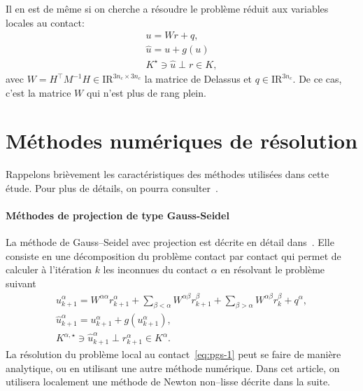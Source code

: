 \documentclass{CSMA2017}
\def\RR{\nbR}
\def\nbR{\ensuremath{\mathrm{I\!R}}} %
\begin{document}
Il en est de même si on cherche a résoudre le problème réduit aux variables locales au contact:
\begin{equation}\label{eq:soccp1-intro}
  \begin{array}{l}
    u = W r + q,  \\
    \hat u = u + g(u) \\
        K^\star \ni {\hat u} \perp r \in K,
  \end{array}
\end{equation}
avec $W = H^\top M^{-1} H \in \RR^{3n_c\times 3n_c}$ la matrice de Delassus et $q\in \RR^{3n_c}$. De ce cas, c'est la matrice $W$ qui n'est plus de rang plein.


\section{Méthodes numériques de résolution}
Rappelons brièvement les caractéristiques des méthodes utilisées dans cette étude. Pour plus de détails, on pourra consulter~\cite{Acary.Brogliato2008}.

\paragraph{Méthodes de projection de type Gauss-Seidel} La méthode de Gauss--Seidel avec projection est décrite en détail dans~\cite{Mitsopoulou.Doudoumis1987,Jourdan.Alart.ea98}. Elle consiste en une décomposition du problème contact par contact qui permet de calculer à l'itération $k$ les inconnues du contact $\alpha$ en résolvant le problème suivant 
\begin{equation}
  \label{eq:pgs-1}
  \begin{array}{c}
  u^{\alpha}_{k+1} = W^{\alpha\alpha} r^{\alpha}_{k+1} + \sum_{\beta < \alpha}W^{\alpha\beta} r^{\beta}_{k+1} + \sum_{\beta > \alpha}W^{\alpha\beta} r^{\beta}_{k} +  q^\alpha,\\[1mm] 
  \hat u^{\alpha}_{k+1} =u^{\alpha}_{k+1} + g(u^{\alpha}_{k+1}), \\[1mm]
   K^{\alpha,\star} \ni {\hat u^{\alpha}_{k+1}} \perp r^{\alpha}_{k+1} \in K^\alpha.
 \end{array}
\end{equation}
La résolution du problème local au contact~\ref{eq:pgs-1} peut se faire de manière analytique, ou en utilisant une autre méthode numérique. Dans cet article, on utilisera localement une méthode de Newton non--lisse décrite dans la suite.
\end{document}
